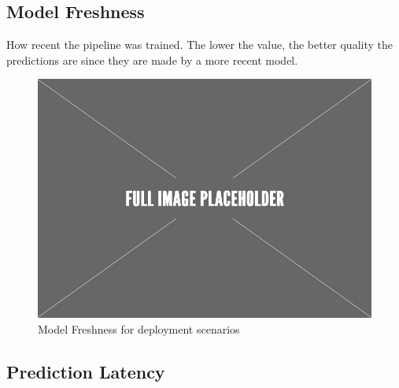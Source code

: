 \documentclass[10pt,conference,letterpaper]{IEEEtran}
\begin{document}
\subsection{Model Freshness}
How recent the pipeline was trained. 
The lower the value, the better quality the predictions are since they are made by a more recent model.
\begin{figure}[h]
\centering
\includegraphics[width=\columnwidth]{../images/placeholder.jpeg}
\caption{Model Freshness for deployment scenarios}
\label{fig:model-freshness-criteo}
\vspace{2mm}
\end{figure}
\subsection{Prediction Latency}
\end{document}
